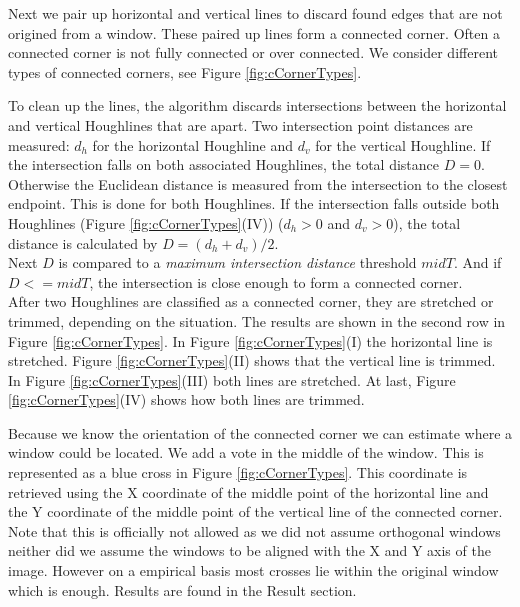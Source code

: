 Next we pair up horizontal and vertical lines to discard found edges that are
not origined from a window. These paired up lines form a connected corner.
Often a connected corner is not fully connected or over connected.
We consider different types of connected corners, see Figure \ref{fig:cCornerTypes}.

To clean up the lines, the algorithm discards intersections between the
horizontal and vertical Houghlines that are apart. 
Two intersection point distances are measured: $d_h$ for the horizontal Houghline and $d_v$
for the vertical Houghline.  If the intersection falls on both associated Houghlines,
	the total distance $D=0$.  Otherwise the Euclidean distance is measured from the
	intersection to the closest endpoint. This is done for both Houghlines.  If
	the intersection falls outside both Houghlines (Figure
	\ref{fig:cCornerTypes}(IV)) ($d_h>0$ and $d_v>0$), the total
	distance is calculated by $D=(d_h + d_v)/2$.\\
	Next $D$ is compared to
	a \emph{maximum intersection distance} threshold $midT$.  And if $D<=midT$,
	the intersection is close enough to form a connected corner.\\

After two Houghlines are classified as a connected corner, they are stretched or
trimmed, depending on the situation. The results are shown in the second row in
Figure \ref{fig:cCornerTypes}.
In Figure \ref{fig:cCornerTypes}(I)  the horizontal line is stretched.  Figure
\ref{fig:cCornerTypes}(II) shows that the vertical line is trimmed.  In Figure
\ref{fig:cCornerTypes}(III) both lines are stretched.  At last, Figure
\ref{fig:cCornerTypes}(IV) shows how both lines are trimmed.


Because we know the orientation of the connected corner we can estimate where
a window could be located.  We add a vote in the middle of the window. 
This is represented as a blue cross in Figure \ref{fig:cCornerTypes}.
This coordinate is retrieved using the X coordinate of the middle point of the horizontal line
and the Y coordinate of the middle point of the vertical line of the connected corner.  
Note that this is officially not allowed as we did not assume orthogonal windows
neither did we assume the windows to be aligned with the X and Y axis of the
image. However on a empirical basis most crosses lie within the original window
which is enough. Results are found in the Result section.



